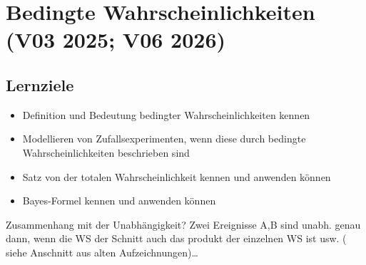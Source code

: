 \chapter{Bedingte Wahrscheinlichkeiten (V03 2025; V06 2026)}\label{ch:bedingte-wahrscheinlichkeiten}







\section*{Lernziele}
\begin{itemize}
    \item Definition und Bedeutung bedingter Wahrscheinlichkeiten kennen
    \item Modellieren von Zufallsexperimenten, wenn diese durch bedingte
    Wahrscheinlichkeiten beschrieben sind
    \item Satz von der totalen Wahrscheinlichkeit kennen und anwenden können
    \item Bayes-Formel kennen und anwenden können
\end{itemize}



Zusammenhang mit der Unabhängigkeit?
Zwei Ereignisse A,B sind unabh.
 genau dann, wenn die WS der Schnitt auch das produkt der einzelnen WS ist usw.
(
siehe Anschnitt aus alten Aufzeichnungen)\ldots




